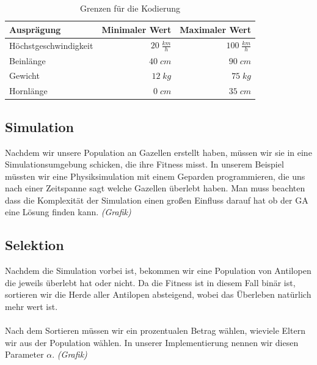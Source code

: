            \begin{table}[H]
                \begin{center}
                \begin{tabular}{ |l|r|r| } 
                    \hline
                    Ausprägung               & Minimaler Wert        & Maximaler Wert       \\ \hline
                    Höchstgeschwindigkeit    & $ 20\; \frac{km}{h}$  & $ 100\; \frac{km}{h}$ \\ \hline
                    Beinlänge                & $ 40\; cm          $  & $ 90\; cm          $ \\ \hline
                    Gewicht                  & $ 12\; kg          $  & $ 75\; kg          $ \\ \hline
                    Hornlänge                & $  0\; cm          $  & $ 35\; cm          $ \\ \hline
                \end{tabular}
                \end{center}
                \caption{Grenzen für die Kodierung \cite{wiki:gazelle} \cite{blog:gazelle}\label{fig:somelabel}}
            \end{table}
            \noindent

        \subsection{Simulation}
            Nachdem wir unsere Population an Gazellen erstellt haben, müssen wir sie in eine Simulationsumgebung schicken, die ihre Fitness misst. In unserem Beispiel müssten wir eine Physiksimulation mit einem Geparden programmieren, die uns nach einer Zeitspanne sagt welche Gazellen überlebt haben. Man muss beachten dass die Komplexität der Simulation einen großen Einfluss darauf hat ob der GA eine Lösung finden kann. $ $\textit{(Grafik)}


        \subsection{Selektion}

            Nachdem die Simulation vorbei ist, bekommen wir eine Population von Antilopen die jeweils überlebt hat oder nicht. Da die Fitness ist in diesem Fall binär ist, sortieren wir die Herde aller Antilopen absteigend, wobei das Überleben natürlich mehr wert ist.\\
            \\
            Nach dem Sortieren müssen wir ein prozentualen Betrag wählen, wieviele Eltern wir aus der Population wählen. In unserer Implementierung nennen wir diesen Parameter $\alpha$. \textit{(Grafik)}

